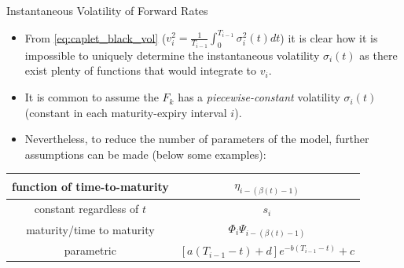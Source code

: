 \documentclass{beamer}
\begin{document}
\begin{frame}{Instantaneous Volatility of Forward Rates}
\begin{itemize}
	\item From \cref{eq:caplet_black_vol} ($v_i^2 = \frac{1}{T_{i-1}}\int_0^{T_{i-1}}\sigma_i^2(t)dt
	$) it is clear how it is impossible to uniquely determine the instantaneous volatility $\sigma_i(t)$ as there exist plenty of functions that would integrate to $v_i$.
	\item It is common to assume the $F_k$ has a \emph{piecewise-constant} volatility $\sigma_i(t)$ (constant in each maturity-expiry interval $i$).
	\item Nevertheless, to reduce the number of parameters of the model, further assumptions can be made (below some examples):
\end{itemize}
\begin{center}
\begin{tabular}{|c|c|}
\hline
function of time-to-maturity & $\eta_{i-(\beta(t)-1)}$ \\ \hline
constant regardless of $t$ & $s_i$ \\ \hline
maturity/time to maturity & $\Phi_i\Psi_{i-(\beta(t)-1)}$ \\ \hline
parametric & $[a(T_{i-1}-t) + d]e^{-b(T_{i-1}-t)} + c$ \\ \hline
\end{tabular} 
\end{center}
\end{frame}

\end{document}
